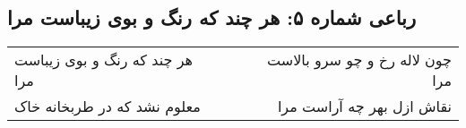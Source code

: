 \begin{center}
\section*{رباعی شماره ۵: هر چند که رنگ و بوی زیباست مرا}
\label{sec:sh005}
\begin{longtable}{l p{0.5cm} r}
هر چند که رنگ و بوی زیباست مرا
&&
چون لاله رخ و چو سرو بالاست مرا
\\
معلوم نشد که در طربخانه خاک
&&
نقاش ازل بهر چه آراست مرا
\\
\end{longtable}
\end{center}
